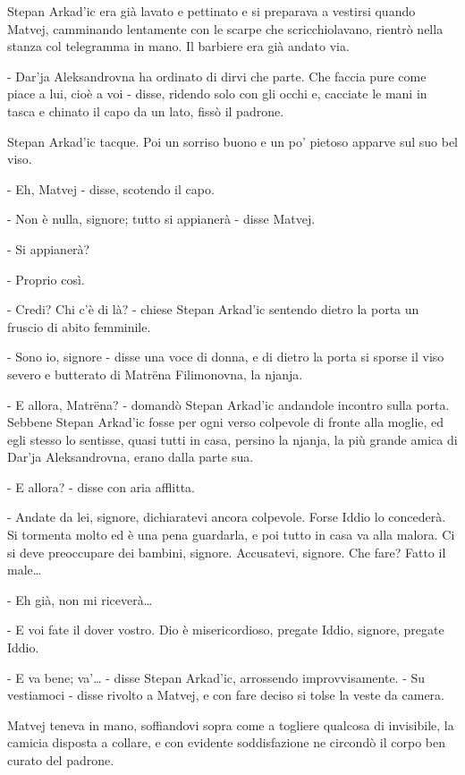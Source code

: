 Stepan Arkad'ic era già lavato e pettinato e si preparava a vestirsi quando Matvej, camminando lentamente con le scarpe che scricchiolavano, rientrò nella stanza col telegramma in mano. Il barbiere era già andato via. 

- Dar'ja Aleksandrovna ha ordinato di dirvi che parte. Che faccia pure come piace a lui, cioè a voi - disse, ridendo solo con gli occhi e, cacciate le mani in tasca e chinato il capo da un lato, fissò il padrone. 

Stepan Arkad'ic tacque. Poi un sorriso buono e un po' pietoso apparve sul suo bel viso. 

- Eh, Matvej - disse, scotendo il capo. 

- Non è nulla, signore; tutto si appianerà - disse Matvej. 

- Si appianerà? 

- Proprio così. 

- Credi? Chi c'è di là? - chiese Stepan Arkad'ic sentendo dietro la porta un fruscio di abito femminile. 

- Sono io, signore - disse una voce di donna, e di dietro la porta si sporse il viso severo e butterato di Matrëna Filimonovna, la njanja. 

- E allora, Matrëna? - domandò Stepan Arkad'ic andandole incontro sulla porta. Sebbene Stepan Arkad'ic fosse per ogni verso colpevole di fronte alla moglie, ed egli stesso lo sentisse, quasi tutti in casa, persino la njanja, la più grande amica di Dar'ja Aleksandrovna, erano dalla parte sua. 

- E allora? - disse con aria afflitta. 

- Andate da lei, signore, dichiaratevi ancora colpevole. Forse Iddio lo concederà. Si tormenta molto ed è una pena guardarla, e poi tutto in casa va alla malora. Ci si deve preoccupare dei bambini, signore. Accusatevi, signore. Che fare? Fatto il male\ldots{} 

- Eh già, non mi riceverà\ldots{} 

- E voi fate il dover vostro. Dio è misericordioso, pregate Iddio, signore, pregate Iddio. 

- E va bene; va'\ldots{} - disse Stepan Arkad'ic, arrossendo improvvisamente. - Su vestiamoci - disse rivolto a Matvej, e con fare deciso si tolse la veste da camera. 

Matvej teneva in mano, soffiandovi sopra come a togliere qualcosa di invisibile, la camicia disposta a collare, e con evidente soddisfazione ne circondò il corpo ben curato del padrone. 

